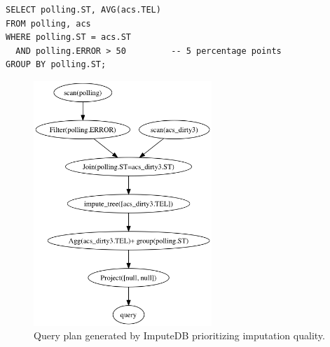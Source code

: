 \begin{verbatim}
SELECT polling.ST, AVG(acs.TEL)
FROM polling, acs
WHERE polling.ST = acs.ST
  AND polling.ERROR > 50         -- 5 percentage points
GROUP BY polling.ST;
\end{verbatim}

\begin{figure}[!ht]
    \centering
    \includegraphics[width=0.6\textwidth]{figures/example.png}
    \caption{Query plan generated by ImputeDB prioritizing imputation quality.}
    \label{fig:query-plan}
\end{figure}
        
